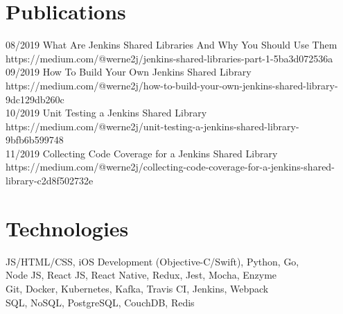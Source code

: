 \documentclass[]{friggeri-cv} %
\begin{document}

\section{Publications}

\begin{entrylist}
\entry
{08/2019}
{What Are Jenkins Shared Libraries And Why You Should Use Them}
{}
{https://medium.com/@werne2j/jenkins-shared-libraries-part-1-5ba3d072536a}\\

\entry
{09/2019}
{How To Build Your Own Jenkins Shared Library}
{}
{https://medium.com/@werne2j/how-to-build-your-own-jenkins-shared-library-9dc129db260c}\\

\entry
{10/2019}
{Unit Testing a Jenkins Shared Library}
{}
{https://medium.com/@werne2j/unit-testing-a-jenkins-shared-library-9bfb6b599748}\\

\entry
{11/2019}
{Collecting Code Coverage for a Jenkins Shared Library}
{}
{https://medium.com/@werne2j/collecting-code-coverage-for-a-jenkins-shared-library-c2d8f502732e}\\

\end{entrylist}


\section{Technologies}
{JS/HTML/CSS, iOS Development (Objective-C/Swift), Python, Go, } \\
{Node JS, React JS, React Native, Redux, Jest, Mocha, Enzyme} \\
{Git, Docker, Kubernetes, Kafka, Travis CI, Jenkins, Webpack} \\
{SQL, NoSQL, PostgreSQL, CouchDB, Redis} \\
\end{document}

